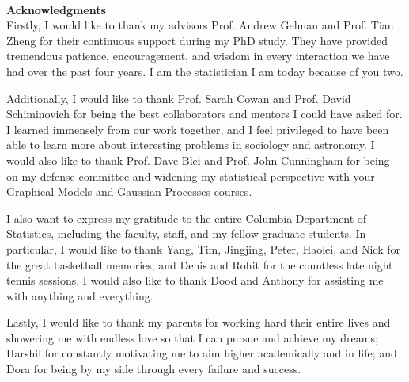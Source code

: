 ~\\[1in] %
\textbf{\Huge Acknowledgments}\\

\noindent 
Firstly, I would like to thank my advisors Prof. Andrew Gelman and Prof. Tian Zheng for their continuous support during my PhD study. They have provided tremendous patience, encouragement, and wisdom in every interaction we have had over the past four years. I am the statistician I am today because of you two.

Additionally, I would like to thank Prof. Sarah Cowan and Prof. David Schiminovich for being the best collaborators and mentors I could have asked for. I learned immensely from our work together, and I feel privileged to have been able to learn more about interesting problems in sociology and astronomy. I would also like to thank Prof. Dave Blei and Prof. John Cunningham for being on my defense committee and widening my statistical perspective with your Graphical Models and Gaussian Processes courses.

I also want to express my gratitude to the entire Columbia Department of Statistics, including the faculty, staff, and my fellow graduate students. In particular, I would like to thank Yang, Tim, Jingjing, Peter, Haolei, and Nick for the great basketball memories; and Denis and Rohit for the countless late night tennis sessions. I would also like to thank Dood and Anthony for assisting me with anything and everything. 

Lastly, I would like to thank my parents for working hard their entire lives and showering me with endless love so that I can pursue and achieve my dreams; Harshil for constantly motivating me to aim higher academically and in life; and Dora for being by my side through every failure and success.